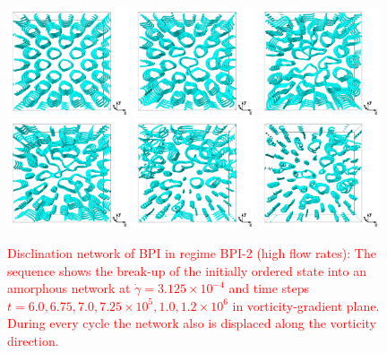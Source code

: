 \documentclass[8.5pt,twoside,twocolumn]{article}
\newcommand{\e}[1]{\times10^{#1}}
\newcommand{\gd}{\dot{\gamma}}
\newcommand{\rev}[1]{{\textcolor{red}{#1}}}
\begin{document}
\begin{figure}[htpb]
\includegraphics[width=0.32\textwidth]{disc-600k_run915r.png}
\includegraphics[width=0.32\textwidth]{disc-675k_run915r.png}
\includegraphics[width=0.32\textwidth]{disc-700k_run915r.png}\\
\includegraphics[width=0.32\textwidth]{disc-725k_run915r.png}
\includegraphics[width=0.32\textwidth]{disc-1000k_run915r.png}
\includegraphics[width=0.32\textwidth]{disc-1200k_run915r.png}
\caption{
\rev{Disclination network of BPI in regime BPI-2 (high flow rates):
The sequence shows the break-up of the initially ordered state into 
an amorphous network at $\gd=3.125\e{-4}$ and time steps
$t=6.0, 6.75, 7.0, 7.25 \e{5}, 1.0,1.2\e{6}$ in vorticity-gradient plane.
During every cycle the network also is displaced
along the vorticity direction.
}
}
\label{bp1-3-disc}
\end{figure}
\end{document}
